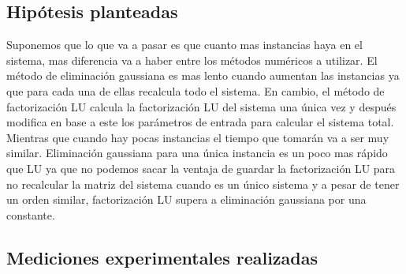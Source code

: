   \subsection{Hipótesis planteadas}

    Suponemos que lo que va a pasar es que cuanto mas instancias haya en el sistema, mas diferencia va a haber entre los métodos numéricos a utilizar. El método de eliminación gaussiana es mas lento cuando aumentan las instancias ya que para cada una de ellas recalcula todo el sistema. En cambio, el método de factorización LU calcula la factorización LU del sistema una única vez y después modifica en base a este los parámetros de entrada para calcular el sistema total. Mientras que cuando hay pocas instancias el tiempo que tomarán va a ser muy similar. Eliminación gaussiana para una única instancia es un poco mas rápido que LU ya que no podemos sacar la ventaja de guardar la factorización LU para no recalcular la matriz del sistema cuando es un único sistema y a pesar de tener un orden similar, factorización LU supera a eliminación gaussiana por una constante.

  \subsection{Mediciones experimentales realizadas}
